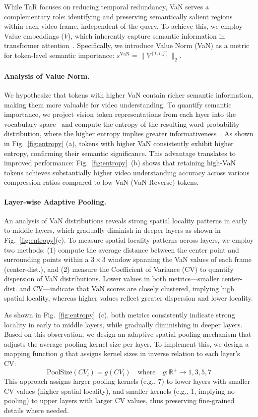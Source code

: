 While TaR focuses on reducing temporal redundancy, VaN serves a complementary role: identifying and preserving semantically salient regions within each video frame, independent of the query.
To achieve this, we employ Value embeddings ($V$), which inherently capture semantic information in transformer attention~\cite{NIPS2017_3f5ee243}.
Specifically, we introduce Value Norm (VaN) as a metric for token-level semantic importance: $s^{\text{VaN}} = \|V^{(t,i,j)}\|_2$.

\paragraph{Analysis of Value Norm.}
We hypothesize that tokens with higher VaN contain richer semantic information, making them more valuable for video understanding.
To quantify semantic importance, we project vision token representations from each layer into the vocabulary space~\cite{neo2025towards} and compute the entropy of the resulting word probability distribution, where the higher entropy implies greater informativeness~\cite{farquhar2024detecting,chan2025analyzing}.
As shown in Fig.~\ref{fig:entropy} (a), tokens with higher VaN consistently exhibit higher entropy, confirming their semantic significance.
This advantage translates to improved performance: Fig.~\ref{fig:entropy}~(b) shows that retaining high-VaN tokens achieves substantially higher video understanding accuracy across various compression ratios compared to low-VaN (VaN Reverse) tokens.


\paragraph{Layer-wise Adaptive Pooling.}
An analysis of VaN distributions reveals strong spatial locality patterns in early to middle layers, which gradually diminish in deeper layers as shown in Fig.~\ref{fig:entropy}(c). To measure spatial locality patterns across layers, we employ two methods: (1) compute the average distance between the center point and surrounding points within a $3\times3$ window spanning the VaN values of each frame (center-dist.), and (2) measure the Coefficient of Variance (CV) to quantify dispersion of VaN distributions. Lower values in both metrics—smaller center-dist. and CV—indicate that VaN scores are closely clustered, implying high spatial locality, whereas higher values reflect greater dispersion and lower locality.

As shown in Fig.~\ref{fig:entropy}~(c), both metrics consistently indicate strong locality in early to middle layers, while gradually diminishing in deeper layers. Based on this observation, we design an adaptive spatial pooling mechanism that adjusts the average pooling kernel size per layer. To implement this, we design a mapping function $g$ that assigns kernel sizes in inverse relation to each layer's CV: 
$$ 
\mathrm{PoolSize}(CV_l) = g(CV_l) \quad \text{where} \quad g : \mathbb{R}^+ \rightarrow {1,3,5,7} 
$$ 
This approach assigns larger pooling kernels (e.g., 7) to lower layers with smaller CV values (higher spatial locality), and smaller kernels (e.g., 1, implying no pooling) to upper layers with larger CV values, thus preserving fine-grained details where needed.


